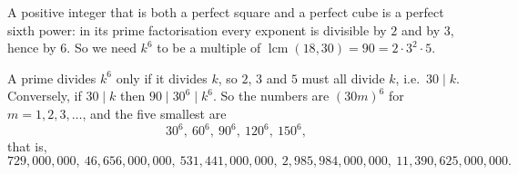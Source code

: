 A positive integer that is both a perfect square and a perfect cube is a perfect sixth power: in its prime factorisation every exponent is divisible by $2$ and by $3$, hence by $6$. So we need $k^6$ to be a multiple of $\operatorname{lcm}(18,30)=90=2\cdot3^2\cdot5$.

A prime divides $k^6$ only if it divides $k$, so $2$, $3$ and $5$ must all divide $k$, i.e.\ $30\mid k$. Conversely, if $30\mid k$ then $90\mid30^6\mid k^6$. So the numbers are $(30m)^6$ for $m=1,2,3,\dots$, and the five smallest are
\[
30^6,\ 60^6,\ 90^6,\ 120^6,\ 150^6 ,
\]
that is,
\[
\boxed{729{,}000{,}000,\ 46{,}656{,}000{,}000,\ 531{,}441{,}000{,}000,\ 2{,}985{,}984{,}000{,}000,\ 11{,}390{,}625{,}000{,}000}.
\]

